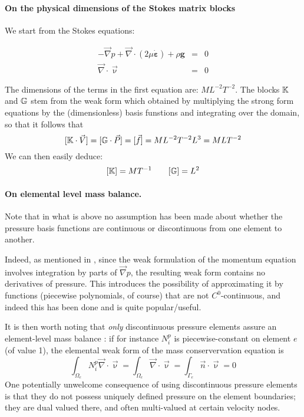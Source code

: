 \paragraph{On the physical dimensions of the Stokes matrix blocks}

We start from the Stokes equations:

\begin{eqnarray}
- {\vec \nabla p} + {\vec \nabla} \cdot (2 \mu \dot{\bm \varepsilon} ) + \rho {\bm g} &=& 0  \\
\vec \nabla \cdot \vec \upnu &=& 0 
\end{eqnarray}

The dimensions of the terms in the first equation are: $ML^{-2}T^{-2}$. The blocks ${\mathbb{K}}$ and ${\mathbb{G}}$
stem from the weak form which obtained by multiplying the strong form equations by the (dimensionless)
basis funstions and integrating over the domain, so that it follows that 
\[
[ {\mathbb{K}} \cdot \vec V] = [{\mathbb{G}} \cdot \vec P] = [\vec f] = ML^{-2}T^{-2} L^3 = MLT^{-2} 
\]
We can then easily deduce:
\[
[{\mathbb{K}}]=MT^{-1}
\quad
\quad
[{\mathbb{G}}]=L^2
\]

\paragraph{On elemental level mass balance.}

Note that in what is above no assumption has been made about whether 
the pressure basis functions are continuous or discontinuous from one 
element to another. 

Indeed, as mentioned in \cite{grsa}, since the 
weak formulation of the momentum equation involves
integration by parts of ${\vec \nabla }p$, the resulting weak form contains 
no derivatives of pressure. This introduces the possibility of approximating it
by functions (piecewise polynomials, of course) that are not $C^0$-continuous, 
and indeed this has been done and is quite popular/useful. 

It is then worth noting that {\sl only} discontinuous pressure 
elements assure an element-level mass balance \cite{grsa}:
if for instance $N_i^p$ is piecewise-constant on element $e$ (of value 1), the 
elemental weak form of the mass conservervation equation is 
\[
\int_{\Omega_e} N_i^p {\vec \nabla} \cdot {\vec \upnu} = 
\int_{\Omega_e} {\vec \nabla} \cdot {\vec \upnu} = 
\int_{\Gamma_e} {\vec n} \cdot {\vec \upnu} = 0
\]
One potentially unwelcome consequence of using 
discontinuous pressure elements is that they 
do not possess uniquely defined pressure 
on the element boundaries; they are dual valued there, 
and often multi-valued at certain velocity nodes. 


